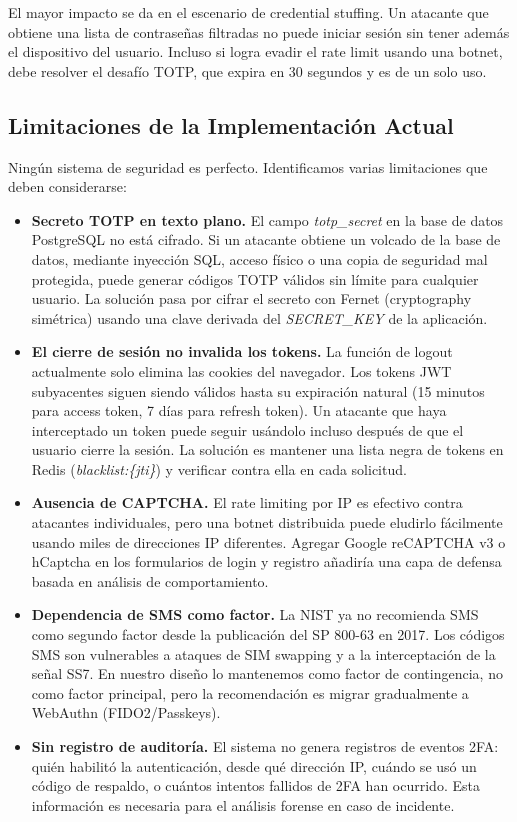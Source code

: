 \documentclass[12pt,letterpaper]{article}
\begin{document}
El mayor impacto se da en el escenario de credential stuffing. Un atacante que obtiene una lista de contrase\~nas filtradas no puede iniciar sesi\'on sin tener adem\'as el dispositivo del usuario. Incluso si logra evadir el rate limit usando una botnet, debe resolver el desaf\'io TOTP, que expira en 30 segundos y es de un solo uso.

\subsection{Limitaciones de la Implementaci\'on Actual}

Ning\'un sistema de seguridad es perfecto. Identificamos varias limitaciones que deben considerarse:

\begin{itemize}
    \item \textbf{Secreto TOTP en texto plano.} El campo \textit{totp\_secret} en la base de datos PostgreSQL no est\'a cifrado. Si un atacante obtiene un volcado de la base de datos, mediante inyecci\'on SQL, acceso f\'isico o una copia de seguridad mal protegida, puede generar c\'odigos TOTP v\'alidos sin l\'imite para cualquier usuario. La soluci\'on pasa por cifrar el secreto con Fernet (cryptography sim\'etrica) usando una clave derivada del \textit{SECRET\_KEY} de la aplicaci\'on.
    \item \textbf{El cierre de sesi\'on no invalida los tokens.} La funci\'on de logout actualmente solo elimina las cookies del navegador. Los tokens JWT subyacentes siguen siendo v\'alidos hasta su expiraci\'on natural (15 minutos para access token, 7 d\'ias para refresh token). Un atacante que haya interceptado un token puede seguir us\'andolo incluso despu\'es de que el usuario cierre la sesi\'on. La soluci\'on es mantener una lista negra de tokens en Redis (\textit{blacklist:\{jti\}}) y verificar contra ella en cada solicitud.
    \item \textbf{Ausencia de CAPTCHA.} El rate limiting por IP es efectivo contra atacantes individuales, pero una botnet distribuida puede eludirlo f\'acilmente usando miles de direcciones IP diferentes. Agregar Google reCAPTCHA v3 o hCaptcha en los formularios de login y registro a\~nadir\'ia una capa de defensa basada en an\'alisis de comportamiento.
    \item \textbf{Dependencia de SMS como factor.} La NIST ya no recomienda SMS como segundo factor desde la publicaci\'on del SP 800-63 en 2017. Los c\'odigos SMS son vulnerables a ataques de SIM swapping y a la interceptaci\'on de la se\~nal SS7. En nuestro dise\~no lo mantenemos como factor de contingencia, no como factor principal, pero la recomendaci\'on es migrar gradualmente a WebAuthn (FIDO2/Passkeys).
    \item \textbf{Sin registro de auditor\'ia.} El sistema no genera registros de eventos 2FA: qui\'en habilit\'o la autenticaci\'on, desde qu\'e direcci\'on IP, cu\'ando se us\'o un c\'odigo de respaldo, o cu\'antos intentos fallidos de 2FA han ocurrido. Esta informaci\'on es necesaria para el an\'alisis forense en caso de incidente.
\end{itemize}
\end{document}
